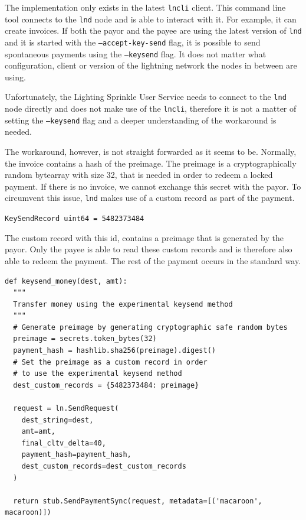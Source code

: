 The implementation only exists in the latest \texttt{lncli} client. This command line tool connects to the \texttt{lnd} node and is able to interact with it. For example, it can create invoices. If both the payor and the payee are using the latest version of \texttt{lnd} and it is started with the \texttt{--accept-key-send} flag, it is possible to send spontaneous payments using the \texttt{--keysend} flag. It does not matter what configuration, client or version of the lightning network the nodes in between are using. 

Unfortunately, the Lighting Sprinkle User Service needs to connect to the \texttt{lnd} node directly and does not make use of the \texttt{lncli}, therefore it is not a matter of setting the \texttt{--keysend} flag and a deeper understanding of the workaround is needed.

The workaround, however, is not straight forwarded as it seems to be. Normally, the invoice contains a hash of the preimage. The preimage is a cryptographically random bytearray with size 32, that is needed in order to redeem a locked payment. If there is no invoice, we cannot exchange this secret with the payor. To circumvent this issue, \texttt{lnd} makes use of a custom record as part of the payment.

\texttt{KeySendRecord uint64 = 5482373484}

The custom record with this id, contains a preimage that is generated by the payor. Only the payee is able to read these custom records and is therefore also able to redeem the payment. The rest of the payment occurs in the standard way.
\lstset{language=Python}
\lstset{frame=lines}
\lstset{basicstyle=\footnotesize}
\begin{lstlisting}
def keysend_money(dest, amt):
  """ 
  Transfer money using the experimental keysend method
  """
  # Generate preimage by generating cryptographic safe random bytes
  preimage = secrets.token_bytes(32) 
  payment_hash = hashlib.sha256(preimage).digest()
  # Set the preimage as a custom record in order 
  # to use the experimental keysend method
  dest_custom_records = {5482373484: preimage}

  request = ln.SendRequest(
    dest_string=dest,
    amt=amt,
    final_cltv_delta=40,
    payment_hash=payment_hash,
    dest_custom_records=dest_custom_records
  )
  
  return stub.SendPaymentSync(request, metadata=[('macaroon', macaroon)])

\end{lstlisting}

